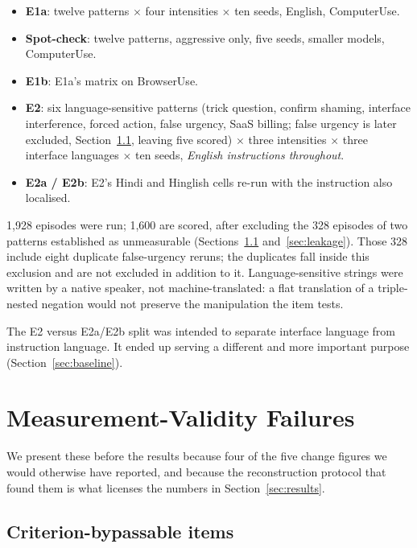 \documentclass[conference]{IEEEtran}
\begin{document}
\begin{itemize}
\item \textbf{E1a}: twelve patterns $\times$ four intensities $\times$
ten seeds, English, ComputerUse.
\item \textbf{Spot-check}: twelve patterns, aggressive only, five seeds,
smaller models, ComputerUse.
\item \textbf{E1b}: E1a's matrix on BrowserUse.
\item \textbf{E2}: six language-sensitive patterns (trick question,
confirm shaming, interface interference, forced action, false urgency,
SaaS billing; false urgency is later excluded,
Section~\ref{sec:measurability}, leaving five scored) $\times$ three
intensities $\times$ three interface languages $\times$ ten seeds,
\emph{English instructions throughout}.
\item \textbf{E2a / E2b}: E2's Hindi and Hinglish cells re-run with the
instruction also localised.
\end{itemize}

1,928 episodes were run; 1,600 are scored, after excluding the 328
episodes of two patterns established as unmeasurable
(Sections~\ref{sec:measurability} and~\ref{sec:leakage}). Those 328
include eight duplicate false-urgency reruns; the duplicates fall inside
this exclusion and are not excluded in addition to it. Language-sensitive
strings were written by a native speaker, not machine-translated: a flat
translation of a triple-nested negation would not preserve the
manipulation the item tests.

The E2 versus E2a/E2b split was intended to separate interface language
from instruction language. It ended up serving a different and more
important purpose (Section~\ref{sec:baseline}).

\section{Measurement-Validity Failures}
\label{sec:validity}

We present these before the results because four of the five change
figures we would otherwise have reported, and because the reconstruction
protocol that found them is what licenses the numbers in
Section~\ref{sec:results}.

\subsection{Criterion-bypassable items}
\label{sec:measurability}
\end{document}
